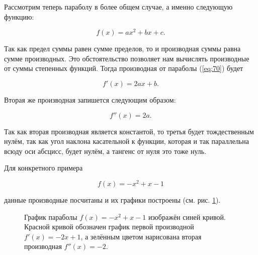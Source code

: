 \documentclass[12pt]{article}
\begin{document}
Рассмотрим теперь параболу в более общем случае, а именно следующую функцию:

\begin{equation}\label{eq:70}
	f(x)=ax^2+bx+c.
\end{equation}

Так как предел суммы равен сумме пределов, то и производная суммы равна сумме производных. Это обстоятельство позволяет нам вычислять производные от суммы степенных функций. Тогда производная от параболы (\ref{eq:70}) будет

\begin{equation}
	f'(x)=2ax+b.
\end{equation}

Вторая же производная запишется следующим образом:

\begin{equation}
	f''(x)=2a.
\end{equation}

Так как вторая производная является константой, то третья будет тождественным нулём, так как угол наклона касательной к функции, которая и так параллельна всюду оси абсцисс, будет нулём, а тангенс от нуля это тоже нуль.

Для конкретного примера 

\begin{equation}
	f(x) = -x^2 + x - 1
\end{equation}

данные производные посчитаны и их графики построены (см. рис. \ref{fig:70}).

\begin{figure}[htbp]
\centering
{}
\caption{График параболы $f(x) = -x^2 + x - 1$ изображён синей кривой. Красной кривой обозначен график первой производной $f'(x) = -2x+1$, а зелённым цветом нарисована вторая производная $f''(x) = -2$.}
\label{fig:70}
\end{figure}
\end{document}
